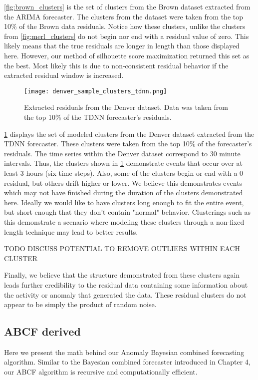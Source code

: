 \ref{fig:brown_clusters} is the set of clusters from the Brown dataset extracted from the ARIMA forecaster.  The clusters from the dataset were taken from the top 10\% of the Brown data residuals.  Notice how these clusters, unlike the clusters from \ref{fig:merl_clusters} do not begin nor end with a residual value of zero.  This likely means that the true residuals are longer in length than those displayed here.  However, our method of silhouette score maximization returned this set as the best.  Most likely this is due to non-consistent residual behavior if the extracted residual window is increased.
  
\begin{figure}
	\begin{center}
		\texttt{[image: denver\_sample\_clusters\_tdnn.png]}
	\end{center}
	\caption{Extracted residuals from the Denver dataset.  Data was taken from the top 10\% of the TDNN forecaster's residuals.}
	\label{fig:denver_clusters}
\end{figure}

\ref{fig:denver_clusters} displays the set of modeled clusters from the Denver dataset extracted from the TDNN forecaster.  These clusters were taken from the top 10\% of the forecaster's residuals.  The time series within the Denver dataset correspond to 30 minute intervals.  Thus, the clusters shown in \ref{fig:denver_clusters} demonstrate events that occur over at least 3 hours (six time steps).  Also, some of the clusters begin or end with a 0 residual, but others drift higher or lower.  We believe this demonstrates events which may not have finished during the duration of the clusters demonstrated here.  Ideally we would like to have clusters long enough to fit the entire event, but short enough that they don't contain "normal" behavior.  Clusterings such as this demonstrate a scenario where modeling these clusters through a non-fixed length technique may lead to better results.

TODO DISCUSS POTENTIAL TO REMOVE OUTLIERS WITHIN EACH CLUSTER

Finally, we believe that the structure demonstrated from these clusters again leads further credibility to the residual data containing some information about the activity or anomaly that generated the data.  These residual clusters do not appear to be simply the product of random noise.  


\subsection{ABCF derived}
\label{sec:abcf}
Here we present the math behind our Anomaly Bayesian combined forecasting algorithm.  Similar to the Bayesian combined forecaster introduced in Chapter 4, our ABCF algorithm is recursive and computationally efficient.  

